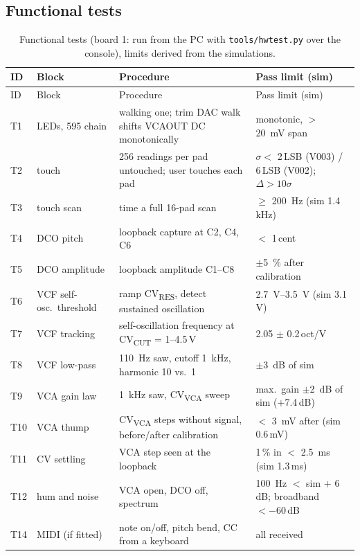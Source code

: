 \documentclass[11pt,a4paper]{article}
\newcommand{\file}[1]{\texttt{#1}}
\newcommand{\sub}[1]{\textsubscript{#1}}
\begin{document}
\subsection{Functional tests}
\begin{longtable}{@{}l l p{6.2cm} p{3.9cm}@{}}
\caption{Functional tests (board 1: run from the PC with \file{tools/hwtest.py} over the console), limits
derived from the simulations.}\label{tab:tests}\\
\toprule ID & Block & Procedure & Pass limit (sim) \\ \midrule\endfirsthead
\toprule ID & Block & Procedure & Pass limit (sim) \\ \midrule\endhead
\bottomrule\endfoot
T1 & LEDs, 595 chain & walking one; trim DAC walk shifts VCAOUT DC monotonically & monotonic, $>$ \SI{20}{mV} span \\
T2 & touch & 256 readings per pad untouched; user touches each pad & $\sigma <$ 2\,LSB (V003) / 6\,LSB (V002); $\Delta > 10\sigma$ \\
T3 & touch scan & time a full 16-pad scan & $\geq$ \SI{200}{Hz} (sim 1.4\,kHz) \\
T4 & DCO pitch & loopback capture at C2, C4, C6 & $<$ 1\,cent \\
T5 & DCO amplitude & loopback amplitude C1--C8 & $\pm$\SI{5}{\percent} after calibration \\
T6 & VCF self-osc.\ threshold & ramp CV\sub{RES}, detect sustained oscillation & \SIrange{2.7}{3.5}{V} (sim 3.1\,V) \\
T7 & VCF tracking & self-oscillation frequency at CV\sub{CUT} = 1--4.5\,V & 2.05 $\pm$ 0.2\,oct/V \\
T8 & VCF low-pass & \SI{110}{Hz} saw, cutoff \SI{1}{kHz}, harmonic 10 vs.\ 1 & $\pm$\SI{3}{dB} of sim \\
T9 & VCA gain law & \SI{1}{kHz} saw, CV\sub{VCA} sweep & max.\ gain $\pm$\SI{2}{dB} of sim (+7.4\,dB) \\
T10 & VCA thump & CV\sub{VCA} steps without signal, before/after calibration & $<$ \SI{3}{mV} after (sim 0.6\,mV) \\
T11 & CV settling & VCA step seen at the loopback & 1\,\% in $<$ \SI{2.5}{ms} (sim 1.3\,ms) \\
T12 & hum and noise & VCA open, DCO off, spectrum & \SI{100}{Hz} $<$ sim + 6\,dB; broadband $< -60$\,dB \\
T14 & MIDI (if fitted) & note on/off, pitch bend, CC from a keyboard & all received \\
\end{longtable}
\end{document}
